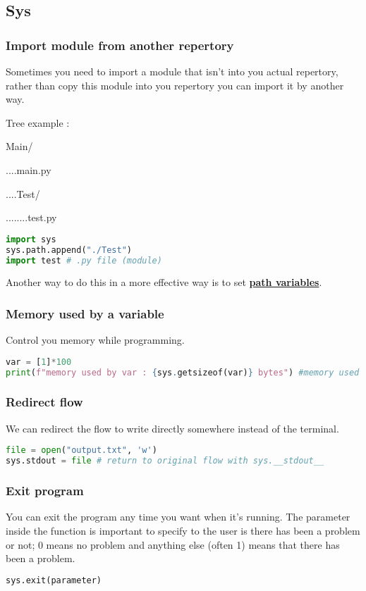 \documentclass[a4paper, 12pt, titlepage]{scrartcl} %
\begin{document}
\subsection{Sys}
\subsubsection{Import module from another repertory}
Sometimes you need to import a module that isn't into you actual repertory, rather than copy this module into you repertory you can import it by another way. 

\vspace{5mm}

Tree example : 

Main/ 

....main.py 

....Test/ 

........test.py 

\begin{lstlisting}[language=Python]
import sys
sys.path.append("./Test")
import test # .py file (module)
\end{lstlisting} \vspace{5mm}

Another way to do this in a more effective way is to set \hyperref[subsec:PathVariables]{\textbf{path variables}}.

\subsubsection{Memory used by a variable}
Control you memory while programming. 
\begin{lstlisting}[language=Python]
var = [1]*100
print(f"memory used by var : {sys.getsizeof(var)} bytes") #memory used by var : 856 bytes
\end{lstlisting} \vspace{5mm}

\subsubsection{Redirect flow}
We can redirect the flow to write directly somewhere instead of the terminal.
\begin{lstlisting}[language=Python]
file = open("output.txt", 'w')
sys.stdout = file # return to original flow with sys.__stdout__
\end{lstlisting} \vspace{5mm}

\subsubsection{Exit program}
You can exit the program any time you want when it's running. The parameter inside the function is important to specify to the user is there has been a problem or not; 0 means no problem and anything else (often 1) means that there has been a problem.
\begin{lstlisting}[language=Python]
sys.exit(parameter)
\end{lstlisting} \vspace{5mm}
\end{document}
